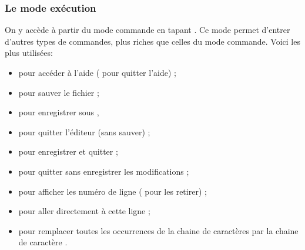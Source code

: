 \documentclass[a4paper,11pt]{style-esi/td}
\begin{document}
			\subsubsection*{Le mode exécution}
			
				On y accède à partir du mode commande en tapant \kbd{:}.
				Ce mode permet d'entrer d'autres types de commandes,
				plus riches que celles du mode commande. 
				Voici les plus utilisées:
				\begin{itemize}
				\item {} pour accéder à l'aide ( pour quitter l'aide) ;
				\item {} pour sauver le fichier ;
				\item {} pour enregistrer sous ,
				\item {} pour quitter l'éditeur (sans sauver) ;
				\item {} pour enregistrer et quitter ;
				\item {} pour quitter sans enregistrer les modifications ;
				\item {} pour afficher les numéro de ligne 
					( pour les retirer) ;
				\item {} pour aller directement à cette ligne ;
				\item {} 
					pour remplacer toutes les occurrences de la chaine de caractères 
					 par la chaine de caractère .
				\end{itemize}
		
\end{document}
